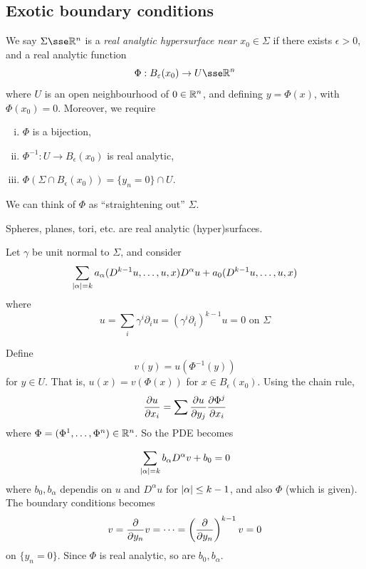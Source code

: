 \documentclass{article}
\begin{document}
\subsection{Exotic boundary conditions}

\begin{definition}
    We say \(\Sigma \sse \R^n\) is a \emph{real analytic hypersurface near \(x_0 \in \Sigma\)} if there exists \(\epsilon > 0\), and a real analytic function
    \[\Phi : B_\epsilon(x_0) \to U \sse \R^n\]
    where \(U\) is an open neighbourhood of \(0 \in \mathbb{R}^n\), and defining \(y = \Phi(x)\), with \(\Phi(x_0) = 0\). Moreover, we require
    \begin{enumerate}[(i)]
        \item \(\Phi\) is a bijection,
        \item \(\Phi^{-1} : U \to B_\epsilon(x_0)\) is real analytic,
        \item \(\Phi(\Sigma \cap B_\epsilon(x_0)) = \{y_n = 0\} \cap U\). 
    \end{enumerate}

    We can think of \(\Phi\) as ``straightening out'' \(\Sigma\).
\end{definition}

\begin{example}
    Spheres, planes, tori, etc. are real analytic (hyper)surfaces.
\end{example}

Let \(\gamma\) be unit normal to \(\Sigma\), and consider
\[\sum_{\abs{\alpha} = k} a_\alpha(D^{k-1}u, \dots, u, x)D^\alpha u + a_0(D^{k-1}u, \dots, u, x)\]
where
\begin{equation}
    \label{eq:surf-pde}
    u = \sum_i\gamma^i\partial_i u = (\gamma^i\partial_i)^{k-1}u = 0 \text{ on }\Sigma
\end{equation}

Define
\[v(y) = u(\Phi^{-1}(y))\]
for \(y \in U\). That is, \(u(x) = v(\Phi(x))\) for \(x \in B_\epsilon(x_0)\). Using the chain rule,
\[\pdv{u}{x_i} = \sum \pdv{u}{y_j} \pdv{\Phi^j}{x_i}\]
where \(\Phi = (\Phi^1, \dots, \Phi^n) \in \mathbb{R}^n\). So the PDE becomes

\[\sum_{\abs{\alpha} = k} b_\alpha D^\alpha v + b_0 = 0\]
where \(b_0, b_\alpha\) dependis on \(u\) and \(D^\alpha u\) for \(\abs{\alpha} \le k-1\), and also \(\Phi\) (which is given). The boundary conditions becomes
\[v = \pdv{y_n}v = \dots = \left(\pdv{y_n}\right)^{k-1}v = 0\]
on \(\{y_n = 0\}\). Since \(\Phi\) is real analytic, so are \(b_0, b_\alpha\).
\end{document}
